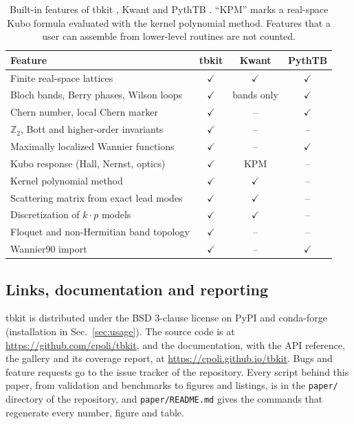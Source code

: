 \documentclass[submission, Phys]{SciPost}
\newcommand{\code}[1]{\texttt{#1}}
\newcommand{\yes}{$\checkmark$}
\newcommand{\no}{--}
\begin{document}
\begin{table}[htb]
\centering\small
\caption{Built-in features of tbkit \tbkitversion, Kwant \kwantversion{}
and PythTB \pythtbversion. ``KPM'' marks a real-space Kubo formula
evaluated with the kernel polynomial method. Features that a user can
assemble from lower-level routines are not counted.}
\label{tab:packages}
\begin{tabular}{lccc}
\toprule
Feature & tbkit & Kwant & PythTB \\
\midrule
Finite real-space lattices & \yes & \yes & \yes \\
Bloch bands, Berry phases, Wilson loops & \yes & bands only & \yes \\
Chern number, local Chern marker & \yes & \no & \yes \\
$\mathbb{Z}_2$, Bott and higher-order invariants & \yes & \no & \no \\
Maximally localized Wannier functions & \yes & \no & \yes \\
Kubo response (Hall, Nernst, optics) & \yes & KPM & \no \\
Kernel polynomial method & \yes & \yes & \no \\
Scattering matrix from exact lead modes & \yes & \yes & \no \\
Discretization of $k\cdot p$ models & \yes & \yes & \no \\
Floquet and non-Hermitian band topology & \yes & \no & \no \\
Wannier90 import & \yes & \no & \yes \\
\bottomrule
\end{tabular}
\end{table}

\subsection{Links, documentation and reporting}

tbkit is distributed under the BSD 3-clause license on PyPI and
conda-forge (installation in Sec.~\ref{sec:usage}). The source code is at
\url{https://github.com/cpoli/tbkit}, and the documentation, with the API
reference, the gallery and its coverage report, at
\url{https://cpoli.github.io/tbkit}. Bugs and feature requests go to the
issue tracker of the repository. Every script behind this paper, from
validation and benchmarks to figures and listings, is in the
\code{paper/} directory of the repository, and \code{paper/README.md}
gives the commands that regenerate every number, figure and table.
\end{document}
